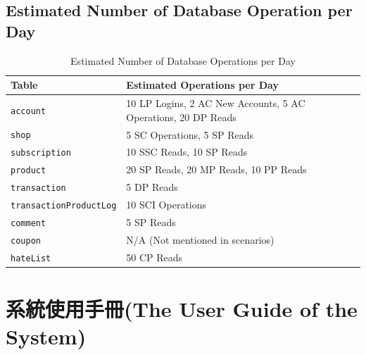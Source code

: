 \documentclass[a4paper, 12pt]{article}
\begin{document}
\subsection{Estimated Number of Database Operation per Day}
\begin{table}[h]
    \renewcommand{\arraystretch}{1.35}
    \begin{tabular}{|p{5cm}|p{7cm}|}
        \hline
        \textbf{Table} & \textbf{Estimated Operations per Day} \\
        \hline
        \texttt{account} & 10 LP Logins, 2 AC New Accounts, 5 AC Operations, 20 DP Reads \\
        \hline
        \texttt{shop} & 5 SC Operations, 5 SP Reads \\
        \hline
        \texttt{subscription} & 10 SSC Reads, 10 SP Reads \\
        \hline
        \texttt{product} & 20 SP Reads, 20 MP Reads, 10 PP Reads \\
        \hline
        \texttt{transaction} & 5 DP Reads \\
        \hline
        \texttt{transactionProductLog} & 10 SCI Operations \\
        \hline
        \texttt{comment} & 5 SP Reads \\
        \hline
        \texttt{coupon} & N/A (Not mentioned in scenarios) \\
        \hline
        \texttt{hateList} & 50 CP Reads \\
        \hline
    \end{tabular}
    \caption{Estimated Number of Database Operations per Day}
    \label{tab:estimated-database-operations}
\end{table}
\newpage
\section{系統使用手冊(The User Guide of the System)}
\end{document}
